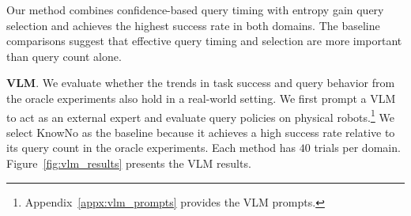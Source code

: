 Our method combines confidence-based query timing with entropy gain query selection and achieves the highest success rate in both domains. The baseline comparisons suggest that effective query timing and selection are more important than query count alone.

\noindent\textbf{VLM}\label{exp:vlm_eval}. We evaluate whether the trends in task success and query behavior from the oracle experiments also hold in a real-world setting. We first prompt a VLM to act as an external expert and evaluate query policies on physical robots.\footnote{Appendix~\ref{appx:vlm_prompts} provides the VLM prompts.} We select KnowNo as the baseline because it achieves a high success rate relative to its query count in the oracle experiments. Each method has $40$ trials per domain. Figure~\ref{fig:vlm_results} presents the VLM results.

